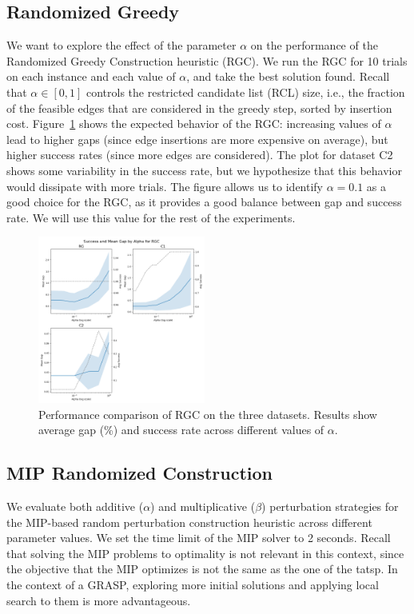 \documentclass[twocolumn, switch]{article} %
\begin{document}
\subsection{Randomized Greedy}
We want to explore the effect of the parameter $\alpha$ on the performance of the Randomized Greedy Construction heuristic (RGC).
We run the RGC for 10 trials on each instance and each value of $\alpha$, and take the best solution found.
Recall that $\alpha \in [0, 1]$ controls the restricted candidate list (RCL) size, i.e., the fraction of the feasible edges that are considered in the greedy step, sorted by insertion cost.
Figure~\ref{fig:alpha_vs_mean_gap_randomized_greedy} shows the expected behavior of the RGC:
increasing values of $\alpha$ lead to higher gaps (since edge insertions are more expensive on average), but higher success rates (since more edges are considered).
The plot for dataset C2 shows some variability in the success rate, but we hypothesize that this behavior would dissipate with more trials.
The figure allows us to identify $\alpha = 0.1$ as a good choice for the RGC, as it provides a good balance between gap and success rate.
We will use this value for the rest of the experiments.

\begin{figure}[h]
    \centering
    \includegraphics[width=0.49\textwidth]{figures/alpha_vs_mean_gap_randomized_greedy.png}
    \caption{Performance comparison of RGC on the three datasets. Results show average gap (\%) and success rate across different values of $\alpha$.}
    \label{fig:alpha_vs_mean_gap_randomized_greedy}
\end{figure}


\subsection{MIP Randomized Construction}

We evaluate both additive ($\alpha$) and multiplicative ($\beta$) perturbation strategies for the MIP-based random perturbation construction heuristic across different parameter values.
We set the time limit of the MIP solver to 2 seconds. Recall that solving the MIP problems to optimality is not relevant in this context, since the objective that the MIP optimizes is not
the same as the one of the \gls{tatsp}. In the context of a GRASP, exploring more initial solutions and applying local search to them is more advantageous.
\end{document}
